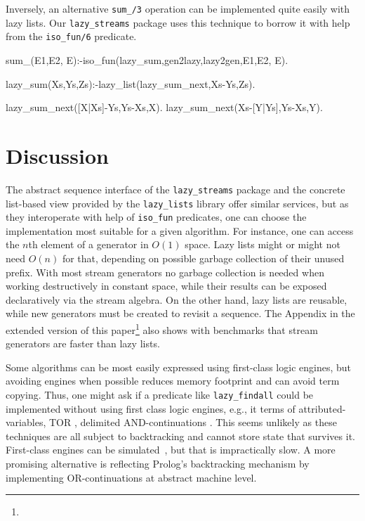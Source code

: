 \documentclass[submission,copyright,creativecommons]{eptcs}
\begin{document}
Inversely, an alternative {\tt sum\_/3} operation  can be implemented 
quite easily with lazy lists. Our {\tt lazy\_streams} package 
uses this technique to borrow it with help from the {\tt iso\_fun/6} predicate.
\begin{code}
sum_(E1,E2, E):-iso_fun(lazy_sum,gen2lazy,lazy2gen,E1,E2, E).

lazy_sum(Xs,Ys,Zs):-lazy_list(lazy_sum_next,Xs-Ys,Zs).
  
lazy_sum_next([X|Xs]-Ys,Ys-Xs,X).
lazy_sum_next(Xs-[Y|Ys],Ys-Xs,Y).
\end{code}

\section{Discussion}\label{disc}

The abstract sequence interface of the {\tt lazy\_streams} package and
the concrete list-based view provided by the {\tt lazy\_lists} library offer
similar services, but as they interoperate with help of {\tt iso\_fun} predicates,
one can choose the  implementation most suitable for a given algorithm.
For instance, one can access the $n$th element of a generator in $O(1)$ space.
Lazy lists might or might not need $O(n)$ for that, depending on possible garbage collection of their unused prefix.
With most stream generators no garbage collection is needed when working destructively in constant space, while their results can be exposed declaratively via the stream algebra.
On the other hand, lazy lists are reusable, while new generators 
must be created to revisit a sequence.
The Appendix in the extended version of this paper\footnote{
}
also shows with benchmarks that stream generators are faster than lazy lists.

Some algorithms can be most easily expressed using first-class logic engines, but
avoiding engines when possible reduces memory footprint and can avoid term copying.
Thus, one might ask if a predicate like {\tt lazy\_findall} could be implemented
without using first class logic engines, e.g., it terms of  
attributed-variables, 
TOR \cite{tor}, delimited AND-continuations \cite{delim}.
This seems unlikely as  these techniques are all subject to backtracking and cannot
store state that survives it. First-class engines can be simulated~\cite{padl09inter}, but that is 
impractically slow. A more promising alternative is reflecting Prolog's backtracking mechanism by implementing OR-continuations at abstract machine level.
\end{document}
